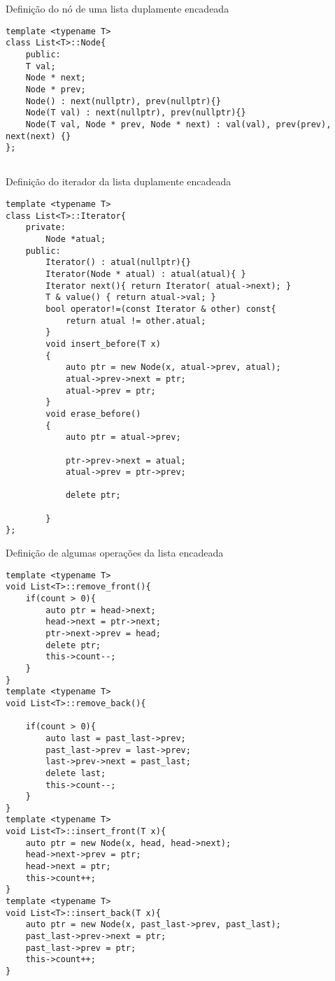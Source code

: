 \begin{listing}[!ht]
\caption{Definição do nó de uma lista duplamente encadeada}
\begin{verbatim}
template <typename T> 
class List<T>::Node{
    public:
    T val;
    Node * next;
    Node * prev;
    Node() : next(nullptr), prev(nullptr){}
    Node(T val) : next(nullptr), prev(nullptr){}
    Node(T val, Node * prev, Node * next) : val(val), prev(prev), next(next) {}    
};


\end{verbatim}
\end{listing}



\begin{listing}[!ht]
\caption{Definição do iterador da lista duplamente encadeada}
\begin{verbatim}
template <typename T> 
class List<T>::Iterator{
    private:
        Node *atual;
    public:
        Iterator() : atual(nullptr){}
        Iterator(Node * atual) : atual(atual){ }
        Iterator next(){ return Iterator( atual->next); }
        T & value() { return atual->val; }
        bool operator!=(const Iterator & other) const{
            return atual != other.atual;
        }
        void insert_before(T x)
        {
            auto ptr = new Node(x, atual->prev, atual);
            atual->prev->next = ptr;
            atual->prev = ptr;
        }
        void erase_before()
        {
            auto ptr = atual->prev;

            ptr->prev->next = atual;
            atual->prev = ptr->prev;

            delete ptr;

        }
};
\end{verbatim}
\end{listing}



\begin{listing}[!ht]
\caption{Definição de algumas operações da lista encadeada}
\begin{verbatim}
template <typename T> 
void List<T>::remove_front(){
    if(count > 0){
        auto ptr = head->next;
        head->next = ptr->next;
        ptr->next->prev = head;
        delete ptr;
        this->count--;
    }
}
template <typename T> 
void List<T>::remove_back(){
    
    if(count > 0){
        auto last = past_last->prev;
        past_last->prev = last->prev;
        last->prev->next = past_last;
        delete last;
        this->count--;
    }
}
template <typename T> 
void List<T>::insert_front(T x){
    auto ptr = new Node(x, head, head->next);
    head->next->prev = ptr;
    head->next = ptr;
    this->count++;
}
template <typename T> 
void List<T>::insert_back(T x){
    auto ptr = new Node(x, past_last->prev, past_last);
    past_last->prev->next = ptr;
    past_last->prev = ptr;
    this->count++;
}

\end{verbatim}
\end{listing}


